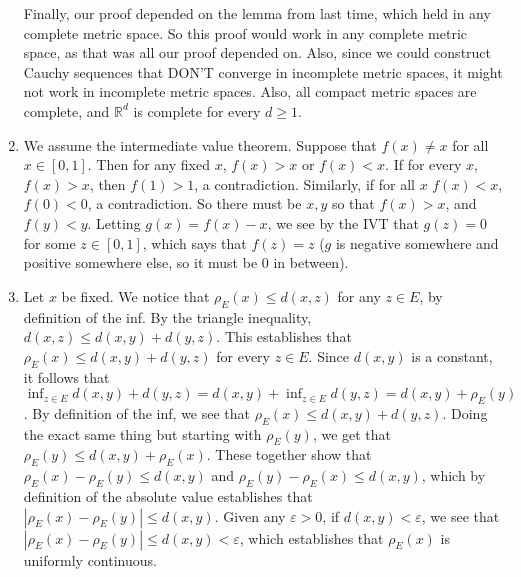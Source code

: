 \documentclass[12pt]{article}
\def\mbb#1{\mathbb{#1}}
\def \R{\mbb{R}}
\def \ve{\varepsilon}
\theoremstyle{definition}
\theoremstyle{remark}
\begin{document}
\begin{enumerate}[leftmargin=\labelsep]
		 Finally, our proof depended on the lemma from last time, which held in any complete metric space. So this proof would work in any complete metric space, as that was all our proof depended on. Also, since we could construct Cauchy sequences that DON'T converge in incomplete metric spaces, it might not work in incomplete metric spaces. Also, all compact metric spaces are complete, and $\R^d$ is complete for every $d \geq 1$.
		
		\item We assume the intermediate value theorem. Suppose that $f(x) \neq x$ for all $x \in [0, 1]$. Then for any fixed $x$, $f(x) > x$ or $f(x) < x$. If for every $x$, $f(x) > x$, then $f(1) > 1$, a contradiction. Similarly, if for all $x$ $f(x) < x$, $f(0) < 0$, a contradiction. So there must be $x, y$ so that $f(x) > x$, and $f(y) < y$. Letting $g(x) = f(x) - x$, we see by the IVT that $g(z) = 0$ for some $z \in [0, 1]$, which says that $f(z) = z$ ($g$ is negative somewhere and positive somewhere else, so it must be 0 in between).
		
		\item Let $x$ be fixed. We notice that $\rho_E(x) \leq d(x, z)$ for any $z \in E$, by definition of the inf. By the triangle inequality, $d(x, z) \leq d(x, y) + d(y, z)$. This establishes that $\rho_E(x) \leq d(x, y) + d(y, z)$ for every $z \in E$. Since $d(x, y)$ is a constant, it follows that $\inf_{z \in E} d(x, y) + d(y, z) = d(x, y) + \inf_{z \in E} d(y, z) = d(x, y) + \rho_E(y)$. By definition of the inf, we see that $\rho_E(x) \leq d(x, y) + d(y, z)$. Doing the exact same thing but starting with $\rho_E(y)$, we get that $\rho_E(y) \leq d(x, y) + \rho_E(x)$. These together show that $\rho_E(x) - \rho_E(y) \leq d(x,y)$ and $\rho_E(y) - \rho_E(x) \leq d(x, y)$, which by definition of the absolute value establishes that $|\rho_E(x) - \rho_E(y)| \leq d(x, y)$. Given any $\ve > 0$, if $d(x, y) < \ve$, we see that $|\rho_E(x) - \rho_E(y)| \leq d(x, y) < \ve$, which establishes that $\rho_E(x)$ is uniformly continuous. 
		

\end{enumerate}
\end{document}
